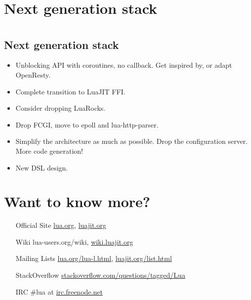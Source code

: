 \documentclass[aspectratio=169,handout,bigger]{beamer}
\begin{document}

\section{Next generation stack}


\section*{}
\subsection*{Next generation stack}

\begin{frame}
  \begin{itemize}
    \item Unblocking API with coroutines, no callback. Get inspired by, or adapt OpenResty.
    \item Complete transition to LuaJIT FFI.
    \item Consider dropping LuaRocks.
    \item Drop FCGI, move to epoll and lua-http-parser.
    \item Simplify the architecture as much as possible. Drop the configuration server. More code generation!
    \item New DSL design.
  \end{itemize}
\end{frame}


\section{Want to know more?}

\begin{frame}
  \begin{center}
  \begin{minipage}{0.6\linewidth}
  \begin{itemize}
    \item[Official Site] \href{http://lua.org}{lua.org}, \href{http://luajit.org}{luajit.org}
    \item[Wiki] lua-users.org/wiki, \href{http://wiki.luajit.org}{wiki.luajit.org}
    \item[Mailing Lists] \href{http://lua.org/lua-l.html}{lua.org/lua-l.html}, \href{http://luajit.org/list.html}{luajit.org/list.html}
    \item[StackOverflow] \href{http://stackoverflow.com/questions/tagged/Lua}{stackoverflow.com/questions/tagged/Lua}
    \item[IRC] \#lua at \href{http://irc.freenode.net}{irc.freenode.net}
  \end{itemize}
  \end{minipage}
  \end{center}
\end{frame}
\end{document}
